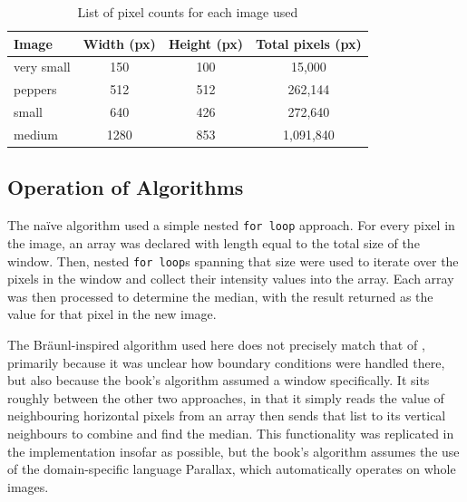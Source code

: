\begin{table}
\centering
\begin{tabular}{@{}lccc@{}}
\toprule
\textbf{Image} & \multicolumn{1}{c}{\textbf{Width (px)}} & \multicolumn{1}{c}{\textbf{Height (px)}} & \multicolumn{1}{c}{\textbf{Total pixels (px)}} \\ \midrule
very small                         & 150                                     & 100                                      & 15,000                                         \\
peppers                            & 512                                     & 512                                      & 262,144                                        \\
small                              & 640                                     & 426                                      & 272,640                                        \\
medium                             & 1280                                    & 853                                      & 1,091,840                                      \\ \bottomrule
\end{tabular}
\caption{List of pixel counts for each image used}
\label{tab:median:pixelcounts}
\end{table}

\subsection{Operation of Algorithms}
The naïve algorithm used a simple nested \texttt{for loop} approach.  For every pixel in the image, an array was declared with length equal to the total size of the window.  Then, nested \texttt{for loop}s spanning that size were used to iterate over the pixels in the window and collect their intensity values into the array.  Each array was then processed to determine the median, with the result returned as the value for that pixel in the new image.

The Bräunl-inspired algorithm used here does not precisely match that of \cite{Braunl2001}, primarily because it was unclear how boundary conditions were handled there, but also because the book's algorithm assumed a  window specifically.  It sits roughly between the other two approaches, in that it simply reads the value of neighbouring horizontal pixels from an array then sends that list to its vertical neighbours to combine and find the median.  This functionality was replicated in the implementation insofar as possible, but the book's algorithm assumes the use of the domain-specific language Parallax, which automatically operates on whole images.

